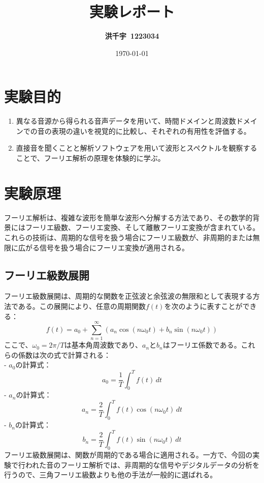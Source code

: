\documentclass{article}
\title{\textbf{実験レポート}} %
\author{\textbf{洪千宇\ 1223034}}
\date{\today}
\begin{document}

\tableofcontents
\newpage %

\section{実験目的}
\begin{enumerate}[label=\arabic*), before=\begin{spacing}{1}, after=\end{spacing}] %
    \item 異なる音源から得られる音声データを用いて、時間ドメインと周波数ドメインでの音の表現の違いを視覚的に比較し、それぞれの有用性を評価する。
    \item 直接音を聞くことと解析ソフトウェアを用いて波形とスペクトルを観察することで、フーリエ解析の原理を体験的に学ぶ。
\end{enumerate}

\section{実験原理}
\begin{spacing}{1.2} %
フーリエ解析は、複雑な波形を簡単な波形へ分解する方法であり、その数学的背景にはフーリエ級数、フーリエ変換、そして離散フーリエ変換が含まれている。これらの技術は、周期的な信号を扱う場合にフーリエ級数が、非周期的または無限に広がる信号を扱う場合にフーリエ変換が適用される。
\end{spacing}
\subsection{フーリエ級数展開}
\begin{spacing}{1.2} %
    フーリエ級数展開は、周期的な関数を正弦波と余弦波の無限和として表現する方法である。この展開により、任意の周期関数$f(t)$を次のように表すことができる：
    \[f(t) = a_0 + \sum_{n=1}^{\infty} \left( a_n \cos(n \omega_0 t) + b_n \sin(n \omega_0 t) \right)\]
    \indent ここで、$\omega_0 = 2\pi/T$は基本角周波数であり、$a_n$と$b_n$はフーリエ係数である。これらの係数は次の式で計算される：\\
    - $a_0$の計算式：
    \[a_0 = \frac{1}{T} \int_{0}^{T} f(t) \, dt\]
    - $a_n$の計算式：
    \[a_n = \frac{2}{T} \int_{0}^{T} f(t) \cos(n \omega_0 t) \, dt\]
    - $b_n$の計算式：
    \[b_n = \frac{2}{T} \int_{0}^{T} f(t) \sin(n \omega_0 t) \, dt\]
    \indent フーリエ級数展開は、関数が周期的である場合に適用される。一方で、今回の実験で行われた音のフーリエ解析では、非周期的な信号やデジタルデータの分析を行うので、三角フーリエ級数よりも他の手法が一般的に選ばれる。
\end{spacing}
\end{document}
